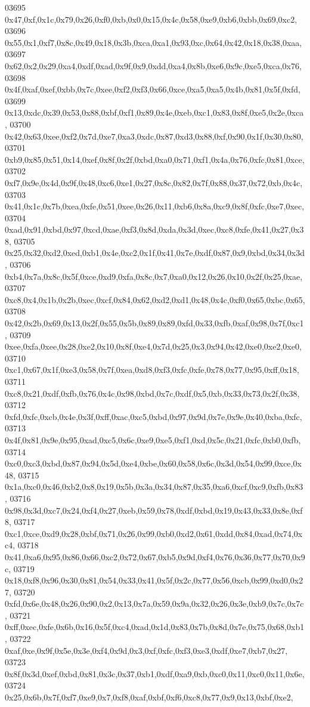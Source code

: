 \begin{DoxyCode}
03695   0x47,0xf,0x1c,0x79,0x26,0xf0,0xb,0x0,0x15,0x4c,0x58,0xe9,0xb6,0xbb,0x69,0xc2,
03696   0x55,0x1,0xf7,0x8c,0x49,0x18,0x3b,0xca,0xa1,0x93,0xc,0x64,0x42,0x18,0x38,0xaa,
03697   0x62,0x2,0x29,0xa4,0xdf,0xad,0x9f,0x9,0xdd,0xa4,0x8b,0xe6,0x9c,0xe5,0xca,0x76,
03698   0x4f,0xaf,0xef,0xbb,0x7c,0xee,0xf2,0xf3,0x66,0xce,0xa5,0xa5,0x4b,0x81,0x5f,0xfd,
03699   0x13,0xdc,0x39,0x53,0x88,0xbf,0xf1,0x89,0x4e,0xeb,0xc1,0x83,0x8f,0xe5,0x2e,0xca,
03700   0x42,0x63,0xee,0xf2,0x7d,0xe7,0xa3,0xdc,0x87,0xd3,0x88,0xf,0x90,0x1f,0x30,0x80,
03701   0xb9,0x85,0x51,0x14,0xef,0x8f,0x2f,0xbd,0xa0,0x71,0xf1,0x4a,0x76,0xfc,0x81,0xce,
03702   0xf7,0x9e,0x4d,0x9f,0x48,0xc6,0xe1,0x27,0x8c,0x82,0x7f,0x88,0x37,0x72,0xb,0x4c,
03703   0x41,0x1c,0x7b,0xea,0xfe,0x51,0xee,0x26,0x11,0xb6,0x8a,0xc9,0x8f,0xfc,0xe7,0xec,
03704   0xad,0x91,0xbd,0x97,0xcd,0xae,0xf3,0x8d,0xda,0x3d,0xec,0xc8,0xfe,0x41,0x27,0x38,
03705   0x25,0x32,0xd2,0xed,0xb1,0x4e,0xc2,0x1f,0x41,0x7e,0xdf,0x87,0x9,0xbd,0x34,0x3d,
03706   0xb4,0x7a,0x8c,0x5f,0xce,0xd9,0xfa,0x8c,0x7,0xa0,0x12,0x26,0x10,0x2f,0x25,0xae,
03707   0xc8,0x4,0x1b,0x2b,0xec,0xcf,0x84,0x62,0xd2,0xd1,0x48,0x4c,0xf0,0x65,0xbc,0x65,
03708   0x42,0x2b,0x69,0x13,0x2f,0x55,0x5b,0x89,0x89,0xfd,0x33,0xfb,0xaf,0x98,0x7f,0xc1,
03709   0xee,0xfa,0xee,0x28,0xe2,0x10,0x8f,0xe4,0x7d,0x25,0x3,0x94,0x42,0xe0,0xe2,0xe0,
03710   0xc1,0x67,0x1f,0xe3,0x58,0x7f,0xea,0xd8,0xf3,0xfc,0xfe,0x78,0x77,0x95,0xff,0x18,
03711   0xc8,0x21,0xdf,0xfb,0x76,0x4c,0x98,0xbd,0x7c,0xdf,0x5,0xb,0x33,0x73,0x2f,0x38,
03712   0xfd,0xfc,0xcb,0x4e,0x3f,0xff,0xac,0xc5,0xbd,0x97,0x9d,0x7e,0x9e,0x40,0xba,0xfc,
03713   0x4f,0x81,0x9e,0x95,0xad,0xc5,0x6c,0xe9,0xe5,0xf1,0xd,0x5c,0x21,0xfc,0xb0,0xfb,
03714   0xc0,0xc3,0xbd,0x87,0x94,0x5d,0xe4,0xbe,0x60,0x58,0x6c,0x3d,0x54,0x99,0xce,0x48,
03715   0x1a,0xc0,0x46,0xb2,0x8,0x19,0x5b,0x3a,0x34,0x87,0x35,0xa6,0xcf,0xc9,0xfb,0x83,
03716   0x98,0x3d,0xc7,0x24,0xf4,0x27,0xeb,0x59,0x78,0xdf,0xbd,0x19,0x43,0x33,0x8e,0xf8,
03717   0xc1,0xce,0xd9,0x28,0xbf,0x71,0x26,0x99,0xb0,0xd2,0x61,0xdd,0x84,0xad,0x74,0xc4,
03718   0x41,0xa6,0x95,0x86,0x66,0xc2,0x72,0x67,0xb5,0x9d,0xf4,0x76,0x36,0x77,0x70,0x9c,
03719   0x18,0xf8,0x96,0x30,0x81,0x54,0x33,0x41,0x5f,0x2c,0x77,0x56,0xcb,0x99,0xd0,0x27,
03720   0xfd,0x6e,0x48,0x26,0x90,0x2,0x13,0x7a,0x59,0x9a,0x32,0x26,0x3e,0xb9,0x7c,0x7c,
03721   0xff,0xec,0xfe,0x6b,0x16,0x5f,0xc4,0xad,0x1d,0x83,0x7b,0x8d,0x7e,0x75,0x68,0xb1,
03722   0xaf,0xe,0x9f,0x5e,0x3e,0xf4,0x9d,0x3,0xf,0xfc,0xf3,0xe3,0xdf,0xe7,0xb7,0x27,
03723   0x8f,0x3d,0xef,0xbd,0x81,0x3c,0x37,0xb1,0xdf,0xa9,0xb,0xc0,0x11,0xc0,0x11,0x6e,
03724   0x25,0x6b,0x7f,0xf7,0xe9,0x7,0xf8,0xaf,0xbf,0xf6,0xc8,0x77,0x9,0x13,0xbf,0xe2,

\end{DoxyCode}
